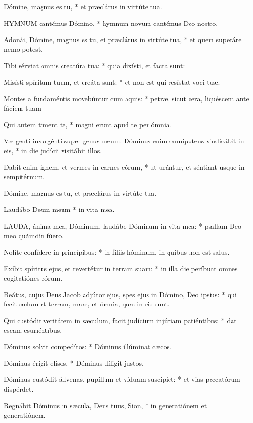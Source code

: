  Dómine, magnus es tu, * et præclárus in virtúte tua.


\lettrine[lines=2]{H}{YMNUM} cantémus Dómino, * hymnum novum cantémus Deo nostro.

Adonái, Dómine, magnus es tu, et præclárus in virtúte tua, * et quem superáre nemo potest.

Tibi sérviat omnis creatúra tua: * quia dixísti, et facta sunt:

Misísti spíritum tuum, et creáta sunt: * et non est qui resístat voci tuæ.

Montes a fundaméntis movebúntur cum aquis: * petræ, sicut cera, liquéscent ante fáciem tuam.

Qui autem timent te, * magni erunt apud te per ómnia.

Væ genti insurgénti super genus meum: Dóminus enim omnípotens vindicábit in eis, * in die judícii visitábit illos.

Dabit enim ignem, et vermes in carnes eórum, * ut urántur, et séntiant usque in sempitérnum.

 Dómine, magnus es tu, et præclárus in virtúte tua.

 Laudábo Deum meum * in vita mea.


\lettrine[lines=2]{L}{AUDA}, ánima mea, Dóminum, laudábo Dóminum in vita mea: * psallam Deo meo quámdiu fúero.

Nolíte confídere in princípibus: * in fíliis hóminum, in quibus non est salus.

Exíbit spíritus ejus, et revertétur in terram suam: * in illa die períbunt omnes cogitatiónes eórum.

Beátus, cujus Deus Jacob adjútor ejus, spes ejus in Dómino, Deo ipsíus: * qui fecit cælum et terram, mare, et ómnia, quæ in eis sunt.

Qui custódit veritátem in sæculum, facit judícium injúriam patiéntibus: * dat escam esuriéntibus.

Dóminus solvit compedítos: * Dóminus illúminat cæcos.

Dóminus érigit elísos, * Dóminus díligit justos.

Dóminus custódit ádvenas, pupíllum et víduam suscípiet: * et vias peccatórum dispérdet.

Regnábit Dóminus in sæcula, Deus tuus, Sion, * in generatiónem et generatiónem.

